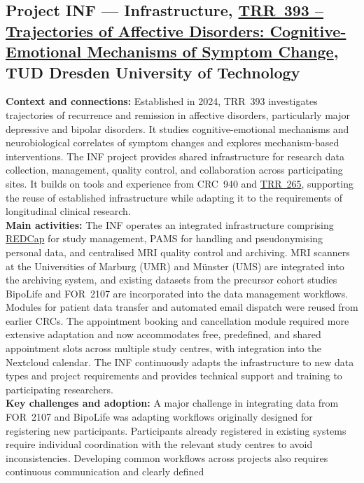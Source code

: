 \documentclass{eceasst}
\begin{document}
\subsection{Project INF --- Infrastructure,
\href{https://gepris.dfg.de/gepris/projekt/521379614?language=en}
{TRR~393 -- Trajectories of Affective Disorders:
Cognitive-Emotional Mechanisms of Symptom Change},
TUD Dresden University of Technology}
\label{subsec:trr393}
\noindent\textbf{Context and connections:}
Established in 2024, TRR~393 investigates trajectories
of recurrence and remission in affective disorders,
particularly major depressive and bipolar disorders.
It studies cognitive-emotional mechanisms and
neurobiological correlates of symptom changes and
explores mechanism-based interventions.
The INF project provides shared infrastructure
for research data collection, management, quality control,
and collaboration across participating sites. It builds
on tools and experience from CRC~940 and
\hyperref[subsec:trr265]{TRR~265}, supporting the reuse
of established infrastructure while adapting it to
the requirements of longitudinal clinical research.
\\
\noindent\textbf{Main activities:}
The INF operates an integrated infrastructure comprising
\href{https://project-redcap.org/}{REDCap} for study
management, PAMS
for handling and pseudonymising personal data, and
centralised MRI quality control and archiving.
MRI scanners at the Universities of Marburg (UMR) and Münster (UMS) are integrated into the
archiving system, and existing datasets from the precursor cohort studies BipoLife
and FOR~2107 are incorporated into the data management
workflows.
Modules for patient data transfer and automated email
dispatch were reused from earlier CRCs.
The appointment booking and cancellation module required
more extensive adaptation and now accommodates free,
predefined, and shared appointment slots across multiple
study centres, with integration into the Nextcloud
calendar.
The INF continuously adapts the infrastructure to
new data types and project requirements and provides
technical support and training to participating researchers.
\\
\noindent\textbf{Key challenges and adoption:}
A major challenge in integrating data from FOR~2107
and BipoLife was adapting workflows originally designed
for registering new participants. Participants already
registered in existing systems require individual
coordination with the relevant study centres to avoid
inconsistencies.
Developing common workflows across projects also
requires continuous communication and clearly defined
\end{document}
